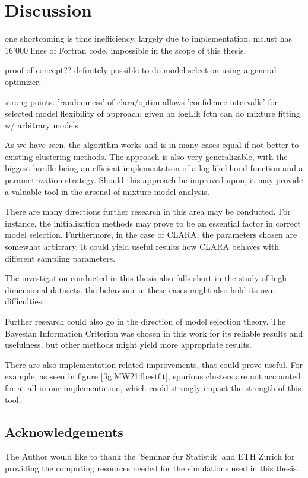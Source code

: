 \chapter{Discussion}




one shortcoming is time inefficiency. largely due to implementation.
mclust has 16'000 lines of Fortran code, impossible in the scope of this thesis.

proof of concept??
definitely possible to do model selection using a general optimizer.

strong points:
'randomness' of clara/optim allows 'confidence intervalls' for selected model
flexibility of approach: given an logLik fctn can do mixture fitting w/ arbitrary
models

As we have seen, the algorithm works and is in many cases equal if not better 
to existing clustering methods. The approach is also very generalizable, with 
the biggest hurdle being an efficient implementation of a log-likelihood 
function and a parametrization strategy.
Should this approach be improved upon, it may provide a valuable tool in the
arsenal of mixture model analysis.

There are many directions further research in this area may be conducted. For 
instance, the initialization methods may prove to be an essential factor in 
correct model selection. Furthermore, in the case of CLARA, the parameters 
chosen are somewhat arbitrary. It could yield useful results how CLARA behaves 
with different sampling parameters.

The investigation conducted in this thesis also falls short in the study of 
high-dimensional datasets. the behaviour in these cases might also hold its own
difficulties.

Further research could also go in the direction of model selection theory. The 
Bayesian Information Criterion was chosen in this work for its reliable results
and usefulness, but other methods might yield more appropriate results.

There are also implementation related improvements, that could prove useful.
For example, as seen in figure \ref{fig:MW214bestfit}, spurious clusters are 
not accounted for at all in our implementation, which could strongly impact the
strength of this tool.


\section{Acknowledgements}

The Author would like to thank the 'Seminar fur Statistik' and ETH Zurich 
for providing the computing resources needed for the simulations used in this
thesis. 
